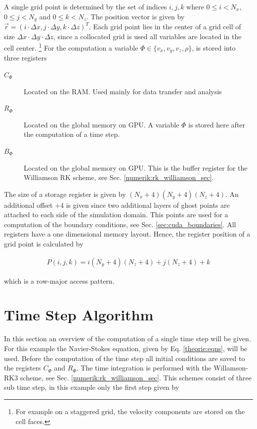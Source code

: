 A single grid point is determined by the set of indices $i,j,k$ where ${0\leq i < N_x}$,
${0\leq j < N_y}$ and ${0\leq k < N_z}$. The position vector is given by ${\vec{r} = (i\cdot\Delta x, j\cdot \Delta y, k\cdot \Delta z)^T}$.
Each grid point lies in the center of a grid cell of size $\Delta x \cdot \Delta y \cdot \Delta z$,
since a collocated grid is used all variables are located in the cell center.
\footnote{For example on a staggered grid, the velocity components are stored on the cell faces.}
For the computation a variable $\Phi\in\{v_x, v_y, v_z, \rho\}$, is stored into three registers

\begin{description}
    \item[$C_\Phi$] Located on the RAM. Used mainly for data transfer and analysis
    \item[$R_\Phi$] Located on the global memory on GPU. A variable $\Phi$ is stored here after the computation of a time step.
    \item[$B_\Phi$] Located on the global memory on GPU. This is the buffer register for the Williamson RK scheme, see Sec. \ref{numerik:rk_williamson_sec}.
\end{description}

The size of a storage register is given by $(N_x+4)(N_y+4)(N_z+4)$.
An additional offset $+4$ is given since two additional layers of ghost points are attached to each side of the simulation domain.
This points are used for a computation of the boundary conditions, see Sec. \ref{sec:cuda_boundaries}.
All registers have a one dimensional memory layout.
Hence, the register position of a grid point is calculated by

\begin{align}
    P(i, j, k) = i(N_y+4)(N_z+4)+j(N_z+4)+k
\end{align}

which is a row-major access pattern.

\section{Time Step Algorithm}
\label{sec:cuda_timestep}

In this section an overview of the computation of a single time step will be given.
For this example the Navier-Stokes equation, given by Eq. \ref{theorie:eqns}, will be used.
Before the computation of the time step all initial conditions are saved to the
registers $C_{\Phi}$ and  $R_{\Phi}$.
The time integration is performed with the Willamson-RK3 scheme, see Sec. \ref{numerik:rk_williamson_sec}.
This schemes consist of three sub time step, in this example only the first step given by

